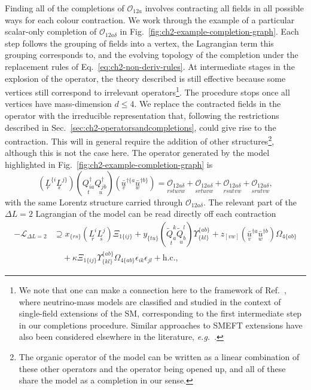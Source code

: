 Finding all of the completions of $\mathcal{O}_{12a}$ involves contracting all
fields in all possible ways for each colour contraction. We work through the
example of a particular scalar-only completion of $\mathcal{O}_{12a\delta}$ in
Fig.~\ref{fig:ch2-example-completion-graph}. Each step follows the grouping of
fields into a vertex, the Lagrangian term this grouping corresponds to, and the
evolving topology of the completion under the replacement rules of
Eq.~\eqref{eq:ch2-non-deriv-rules}. At intermediate stages in the explosion of the
operator, the theory described is still effective because some vertices still
correspond to irrelevant operators\footnote{We note that one can make a
  connection here to the framework of Ref.~\cite{Herrero-Garcia:2019czj}, where
  neutrino-mass models are classified and studied in the context of single-field
  extensions of the SM, corresponding to the first intermediate step in our
  completions procedure. Similar approaches to SMEFT extensions have also been
  considered elsewhere in the literature,
  \textit{e.g.}~\cite{Banerjee:2020jun}.}. The procedure stops once all vertices
have mass-dimension $d \leq 4$. We replace the contracted fields in the operator
with the irreducible representation that, following the restrictions described
in Sec.~\ref{sec:ch2-operatorsandcompletions}, could give rise to the contraction.
This will in general require the addition of other structures\footnote{The
  organic operator of the model can be written as a linear combination of these
  other operators and the operator being opened up, and all of these share the
  model as a completion in our sense.}, although this is not the case here. The
operator generated by the model highlighted in
Fig.~\ref{fig:ch2-example-completion-graph} is
\begin{equation}
  (\underset{r}{L}^{\{i}\underset{s}{L}^{j\}})(\underset{t}{Q^{\dagger}_{i a}} \underset{u}{Q^{\dagger}_{j b}})(\underset{v}{\bar{u}}^{\dagger \{a} \underset{w}{\bar{u}}^{\dagger b\}}) = \underset{rstuvw}{\mathcal{O}_{12a\delta}} + \underset{srtuvw}{\mathcal{O}_{12a\delta}} + \underset{rsutvw}{\mathcal{O}_{12a\delta}} + \underset{srutvw}{\mathcal{O}_{12a\delta}},
\end{equation}
with the same Lorentz structure carried through $\mathcal{O}_{12a\delta}$. The
relevant part of the $\Delta L = 2$ Lagrangian of the model can be read directly off each contraction
\begin{equation}
  \begin{split}
    - \mathscr{L}_{\Delta L = 2} &\supseteq x_{\{rs\}} (\underset{r}{L^{i}} \underset{s}{L^{j}}) \Xi_{1 \{ij\}} + y_{\{tu\}}(\underset{t}{\tilde{Q}_{a}^{k}} \underset{u}{\tilde{Q}_{b}^{l}}) \Upsilon_{\{kl\}}^{\{ab\}} + z_{[vw]}(\underset{v}{\bar{u}}^{\dagger a} \underset{w}{\bar{u}}^{\dagger b}) \Omega_{4 \{ab\}}\\
    &\quad + \kappa \Xi_{1 \{ij\}} \Upsilon^{\{ab\}}_{\{kl\}} \Omega_{4 \{a b\}} \epsilon_{ik} \epsilon_{jl} + \text{h.c.},
  \end{split}
\end{equation}
